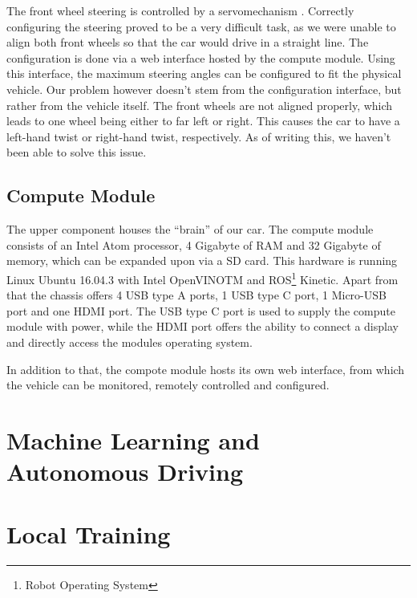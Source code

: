 The front wheel steering is controlled by a servomechanism \cite{AWS19}. Correctly configuring the steering proved to be a very difficult task, as we were unable to align both front wheels so that the car would drive in a straight line. The configuration is done via a web interface hosted by the compute module. Using this interface, the maximum steering angles can be configured to fit the physical vehicle. Our problem however doesn't stem from the configuration interface, but rather from the vehicle itself. The front wheels are not aligned properly, which leads to one wheel being either to far left or right. This causes the car to have a left-hand twist or right-hand twist, respectively. As of writing this, we haven't been able to solve this issue.

\subsection{Compute Module}
The upper component houses the ``brain'' of our car. The compute module consists of an Intel Atom
processor, 4 Gigabyte of RAM and 32 Gigabyte of memory, which can be expanded upon via a SD card. This hardware is running Linux Ubuntu 16.04.3 with Intel OpenVINO\textsc{TM} and ROS\footnote{Robot Operating System} Kinetic. Apart from that the chassis offers 4 USB type A ports, 1 USB type C port, 1 Micro-USB port and one HDMI port. The USB type C port is used to supply the compute module with power, while the HDMI port offers the ability to connect a display and directly access the modules operating system.

In addition to that, the compote module hosts its own web interface, from which the vehicle can be monitored, remotely controlled and configured.

\section{Machine Learning and Autonomous Driving}


 \section{Local Training}
 
